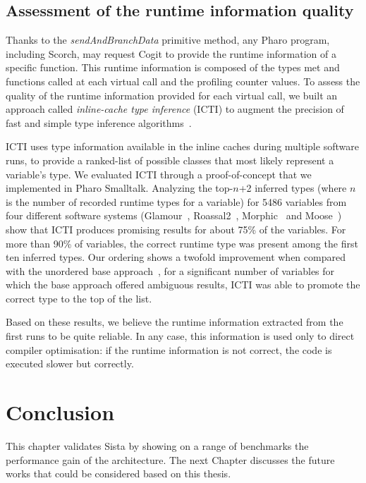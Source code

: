 \documentclass[a4paper,12pt,twoside]{../includes/ThesisStyle}
\begin{document}
\subsection{Assessment of the runtime information quality}

Thanks to the \emph{sendAndBranchData} primitive method, any Pharo program, including Scorch, may request Cogit to provide the runtime information of a specific function. This runtime information is composed of the types met and functions called at each virtual call and the profiling counter values. To assess the quality of the runtime information provided for each virtual call, we built an approach called \emph{inline-cache type inference} (ICTI) to augment the precision of fast and simple type inference algorithms~\cite{Milo16a}. 

ICTI uses type information available in the inline caches during multiple software runs, to provide a ranked-list of possible classes that most likely represent a variable's type. We evaluated ICTI through a proof-of-concept that we implemented in Pharo Smalltalk. Analyzing the top-$n$+2 inferred types (where $n$ is the number of recorded runtime types for a variable) for 5486 variables from four different software systems (Glamour~\cite{Bung09a}, Roassal2~\cite{Pena13a}, Morphic~\cite{Fern07y} and Moose~\cite{Girb10a, Duca05a, Duca00b}) show that ICTI produces promising results for about 75\% of the variables. For more than 90\% of variables, the correct runtime type was present among the first ten inferred types. Our ordering shows a twofold improvement when compared with the unordered base approach~\cite{Pluq09a}, \ie for a significant number of variables for which the base approach offered ambiguous results, ICTI was able to promote the correct type to the top of the list.

Based on these results, we believe the runtime information extracted from the first runs to be quite reliable. In any case, this information is used only to direct compiler optimisation: if the runtime information is not correct, the code is executed slower but correctly.


\section*{Conclusion}

This chapter validates Sista by showing on a range of benchmarks the performance gain of the architecture. The next Chapter discusses the future works that could be considered based on this thesis.

\ifx\wholebook\relax\else
    
\end{document}

